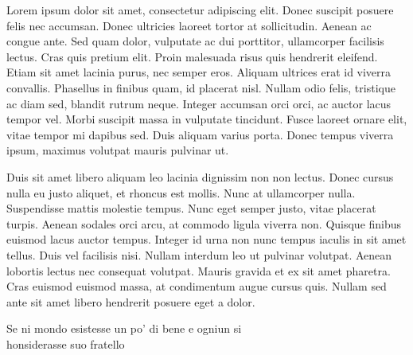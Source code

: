 

Lorem ipsum dolor sit amet, consectetur adipiscing elit. Donec suscipit posuere felis nec accumsan. Donec ultricies laoreet tortor at sollicitudin. Aenean ac congue ante. Sed quam dolor, vulputate ac dui porttitor, ullamcorper facilisis lectus. Cras quis pretium elit. Proin malesuada risus quis hendrerit eleifend. Etiam sit amet lacinia purus, nec semper eros. Aliquam ultrices erat id viverra convallis. Phasellus in finibus quam, id placerat nisl. Nullam odio felis, tristique ac diam sed, blandit rutrum neque. Integer accumsan orci orci, ac auctor lacus tempor vel. Morbi suscipit massa in vulputate tincidunt. Fusce laoreet ornare elit, vitae tempor mi dapibus sed. Duis aliquam varius porta. Donec tempus viverra ipsum, maximus volutpat mauris pulvinar ut.

Duis sit amet libero aliquam leo lacinia dignissim non non lectus. Donec cursus nulla eu justo aliquet, et rhoncus est mollis. Nunc at ullamcorper nulla. Suspendisse mattis molestie tempus. Nunc eget semper justo, vitae placerat turpis. Aenean sodales orci arcu, at commodo ligula viverra non. Quisque finibus euismod lacus auctor tempus. Integer id urna non nunc tempus iaculis in sit amet tellus. Duis vel facilisis nisi. Nullam interdum leo ut pulvinar volutpat. Aenean lobortis lectus nec consequat volutpat. Mauris gravida et ex sit amet pharetra. Cras euismod euismod massa, at condimentum augue cursus quis. Nullam sed ante sit amet libero hendrerit posuere eget a dolor. 

Se ni mondo esistesse un po' di bene e ogniun si \\honsiderasse suo 
fratello